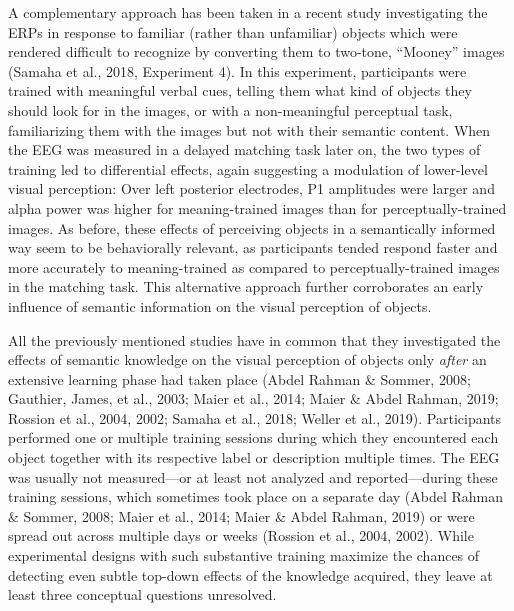 \documentclass[
  english,
  doc,12pt,twoside,floatsintext]{apa7}
\begin{document}
A complementary approach has been taken in a recent study investigating the ERPs in response to familiar (rather than unfamiliar) objects which were rendered difficult to recognize by converting them to two-tone, ``Mooney'' images (Samaha et al., 2018, Experiment 4). In this experiment, participants were trained with meaningful verbal cues, telling them what kind of objects they should look for in the images, or with a non-meaningful perceptual task, familiarizing them with the images but not with their semantic content. When the EEG was measured in a delayed matching task later on, the two types of training led to differential effects, again suggesting a modulation of lower-level visual perception: Over left posterior electrodes, P1 amplitudes were larger and alpha power was higher for meaning-trained images than for perceptually-trained images. As before, these effects of perceiving objects in a semantically informed way seem to be behaviorally relevant, as participants tended respond faster and more accurately to meaning-trained as compared to perceptually-trained images in the matching task. This alternative approach further corroborates an early influence of semantic information on the visual perception of objects.

All the previously mentioned studies have in common that they investigated the effects of semantic knowledge on the visual perception of objects only \emph{after} an extensive learning phase had taken place (Abdel Rahman \& Sommer, 2008; Gauthier, James, et al., 2003; Maier et al., 2014; Maier \& Abdel Rahman, 2019; Rossion et al., 2004, 2002; Samaha et al., 2018; Weller et al., 2019). Participants performed one or multiple training sessions during which they encountered each object together with its respective label or description multiple times. The EEG was usually not measured---or at least not analyzed and reported---during these training sessions, which sometimes took place on a separate day (Abdel Rahman \& Sommer, 2008; Maier et al., 2014; Maier \& Abdel Rahman, 2019) or were spread out across multiple days or weeks (Rossion et al., 2004, 2002). While experimental designs with such substantive training maximize the chances of detecting even subtle top-down effects of the knowledge acquired, they leave at least three conceptual questions unresolved.
\end{document}
